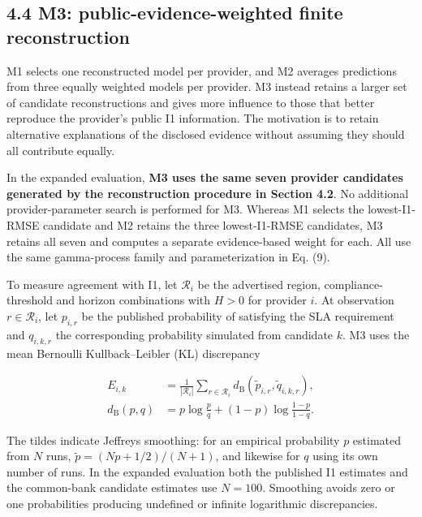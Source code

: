 \documentclass[10pt,a4paper]{article}
\begin{document}
\subsection*{4.4 M3: public-evidence-weighted finite reconstruction}
\label{sec:m3-method}

M1 selects one reconstructed model per provider, and M2 averages predictions from three equally weighted models per provider. M3 instead retains a larger set of candidate reconstructions and gives more influence to those that better reproduce the provider's public I1 information. The motivation is to retain alternative explanations of the disclosed evidence without assuming they should all contribute equally.

In the expanded evaluation, \textbf{M3 uses the same seven provider candidates generated by the reconstruction procedure in Section 4.2}. No additional provider-parameter search is performed for M3. Whereas M1 selects the lowest-I1-RMSE candidate and M2 retains the three lowest-I1-RMSE candidates, M3 retains all seven and computes a separate evidence-based weight for each. All use the same gamma-process family and parameterization in Eq. (9).

To measure agreement with I1, let $\mathcal R_i$ be the advertised region, compliance-threshold and horizon combinations with $H>0$ for provider $i$. At observation $r\in\mathcal R_i$, let $p_{i,r}$ be the published probability of satisfying the SLA requirement and $q_{i,k,r}$ the corresponding probability simulated from candidate $k$. M3 uses the mean Bernoulli Kullback--Leibler (KL) discrepancy

\begin{equation*}
\begin{aligned}
E_{i,k}
&=\frac{1}{|\mathcal R_i|}\sum_{r\in\mathcal R_i}
d_{\mathrm B}(\widetilde p_{i,r},\widetilde q_{i,k,r}),\\
d_{\mathrm B}(p,q)
&=p\log\frac{p}{q}+(1-p)\log\frac{1-p}{1-q}.
\end{aligned}
\tag{11}
\end{equation*}

The tildes indicate Jeffreys smoothing: for an empirical probability $p$ estimated from $N$ runs, $\widetilde p=(Np+1/2)/(N+1)$, and likewise for $q$ using its own number of runs. In the expanded evaluation both the published I1 estimates and the common-bank candidate estimates use $N=100$. Smoothing avoids zero or one probabilities producing undefined or infinite logarithmic discrepancies.
\end{document}
